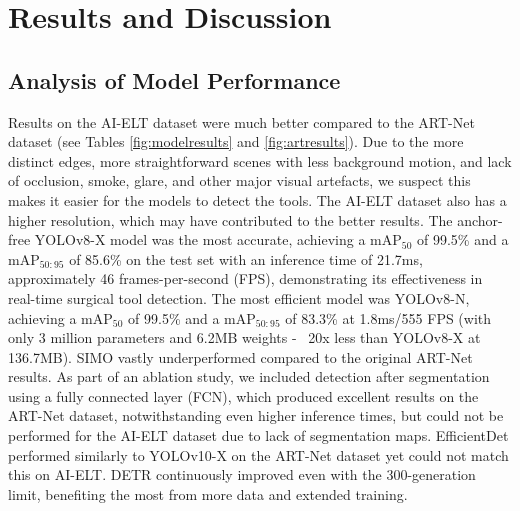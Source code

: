 \section{Results and Discussion}

\subsection{Analysis of Model Performance}

Results on the AI-ELT dataset were much better compared to the ART-Net dataset (see Tables \ref{fig:modelresults} and \ref{fig:artresults}). Due to the more distinct edges, more straightforward scenes with less background motion, and lack of occlusion, smoke, glare, and other major visual artefacts, we suspect this makes it easier for the models to detect the tools. The AI-ELT dataset also has a higher resolution, which may have contributed to the better results. The anchor-free YOLOv8-X model was the most accurate, achieving a mAP$_{50}$ of 99.5\% and a mAP$_{50:95}$ of 85.6\% on the test set with an inference time of 21.7ms, approximately 46 frames-per-second (FPS), demonstrating its effectiveness in real-time surgical tool detection. The most efficient model was YOLOv8-N, achieving a mAP$_{50}$ of 99.5\% and a mAP$_{50:95}$ of 83.3\% at 1.8ms/555 FPS (with only 3 million parameters and 6.2MB weights - ~20x less than YOLOv8-X at 136.7MB). SIMO vastly underperformed compared to the original ART-Net results. As part of an ablation study, we included detection after segmentation using a fully connected layer (FCN), which produced excellent results on the ART-Net dataset, notwithstanding even higher inference times, but could not be performed for the AI-ELT dataset due to lack of segmentation maps. EfficientDet performed similarly to YOLOv10-X on the ART-Net dataset yet could not match this on AI-ELT. DETR continuously improved even with the 300-generation limit, benefiting the most from more data and extended training. 

